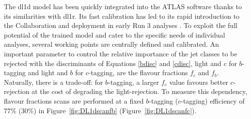 \vspace{-0.5cm} %
The \gls{dl1d} model has been quickly integrated into the ATLAS software thanks to its similarities with \gls{dl1r}. Its fast calibration has led to its rapid introduction to the Collaboration and deployment in early Run 3 analyses \cite{ATLAS-CONF-2022-070}. To exploit the full potential of the trained model and cater to the specific needs of individual analyses, several working points are centrally defined and calibrated. An important parameter to control the relative importance of the jet classes to be rejected with the discriminants of Equations \ref{bdisc} and \ref{cdisc}, light and $c$ for $b$-tagging and light and $b$ for $c$-tagging, are the flavour fractions $f_c$ and $f_b$. Naturally, there is a trade-off: for $b$-tagging, a larger $f_c$ value favours better $c$-rejection at the cost of degrading the light-rejection. To measure this dependency, flavour fractions scans are performed at a fixed $b$-tagging ($c$-tagging) efficiency of 77\% (30\%) in Figure~\ref{fig:DL1dscanfb} (Figure~\ref{fig:DL1dscanfc}). \\

